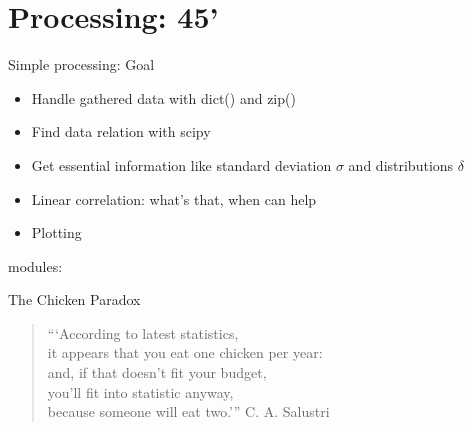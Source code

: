 \section{Processing: 45'}

\begin{pyframe}{Simple processing: Goal}
\begin{itemize}
\item Handle gathered data with dict() and zip()
\item Find data relation with scipy
\item Get essential information like standard deviation $\sigma$ and distributions $\delta$
\item Linear correlation: what's that, when can help
\item Plotting
\end{itemize}
modules: 
\end{pyframe}


\begin{pyframe}{The Chicken Paradox}
\begin{verse}
```According to latest statistics, \\
it appears that you eat one chicken per year: \\
and, if that doesn't fit your budget,\\
you'll fit into statistic anyway,\\
because someone will eat two.'''
\hfill C. A. Salustri
\end{verse}
\end{pyframe}

